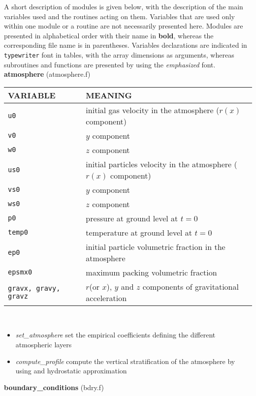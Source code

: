 A short description of modules is given below, with the description of the main 
variables used and the routines acting on them. Variables that are used only within one
module or a routine are not necessarily presented here.
Modules are presented in alphabetical order with their name in {\bf bold}, whereas the corresponding
file name is in parentheses. 
Variables declarations are indicated in {\tt typewriter} font in tables, 
with the array dimensions as arguments, whereas subroutines and functions
are presented by using the {\em emphasized} font.\\[5mm]
%
%
{\large {\bf atmosphere}} (atmosphere.f)\\[5mm]
\begin{tabular}{|p{6cm}|p{6cm}|} \hline
VARIABLE & MEANING\\\hline
\tt u0         & initial gas velocity in the atmosphere ($r(x)$ component)\\\hline
\tt v0         & $y$ component\\\hline
\tt w0         & $z$ component\\\hline
\tt us0        & initial particles velocity in the atmosphere ($r(x)$ component)\\ \hline
\tt vs0        & $y$ component\\\hline
\tt ws0        & $z$ component\\\hline
\tt p0         & pressure at ground level at $t=0$\\ \hline
\tt temp0      & temperature at ground level at $t=0$\\ \hline
\tt ep0        & initial particle volumetric fraction in the atmosphere\\\hline
\tt epsmx0     & maximum packing volumetric fraction \\\hline
\tt gravx, gravy, gravz & $r$(or $x$), $y$ and $z$ components of gravitational acceleration\\ \hline
\end{tabular}\\

\begin{itemize}
\item {\em set\_atmosphere} set the empirical coefficients defining the different atmospheric layers
\item {\em compute\_profile} compute the vertical stratification of the atmosphere by using
 and hydrostatic approximation
\end{itemize}
%
%
{\large {\bf boundary\_conditions}} (bdry.f)\\

